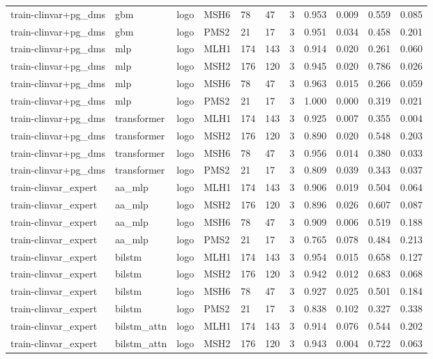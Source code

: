 \begin{table}[t]
\begin{tabular}{lllllllllll}
train-clinvar+pg\_dms & gbm & logo & MSH6 & 78 & 47 & 3 & 0.953 & 0.009 & 0.559 & 0.085 \\
train-clinvar+pg\_dms & gbm & logo & PMS2 & 21 & 17 & 3 & 0.951 & 0.034 & 0.458 & 0.201 \\
train-clinvar+pg\_dms & mlp & logo & MLH1 & 174 & 143 & 3 & 0.914 & 0.020 & 0.261 & 0.060 \\
train-clinvar+pg\_dms & mlp & logo & MSH2 & 176 & 120 & 3 & 0.945 & 0.020 & 0.786 & 0.026 \\
train-clinvar+pg\_dms & mlp & logo & MSH6 & 78 & 47 & 3 & 0.963 & 0.015 & 0.266 & 0.059 \\
train-clinvar+pg\_dms & mlp & logo & PMS2 & 21 & 17 & 3 & 1.000 & 0.000 & 0.319 & 0.021 \\
train-clinvar+pg\_dms & transformer & logo & MLH1 & 174 & 143 & 3 & 0.925 & 0.007 & 0.355 & 0.004 \\
train-clinvar+pg\_dms & transformer & logo & MSH2 & 176 & 120 & 3 & 0.890 & 0.020 & 0.548 & 0.203 \\
train-clinvar+pg\_dms & transformer & logo & MSH6 & 78 & 47 & 3 & 0.956 & 0.014 & 0.380 & 0.033 \\
train-clinvar+pg\_dms & transformer & logo & PMS2 & 21 & 17 & 3 & 0.809 & 0.039 & 0.343 & 0.037 \\
train-clinvar\_expert & aa\_mlp & logo & MLH1 & 174 & 143 & 3 & 0.906 & 0.019 & 0.504 & 0.064 \\
train-clinvar\_expert & aa\_mlp & logo & MSH2 & 176 & 120 & 3 & 0.896 & 0.026 & 0.607 & 0.087 \\
train-clinvar\_expert & aa\_mlp & logo & MSH6 & 78 & 47 & 3 & 0.909 & 0.006 & 0.519 & 0.188 \\
train-clinvar\_expert & aa\_mlp & logo & PMS2 & 21 & 17 & 3 & 0.765 & 0.078 & 0.484 & 0.213 \\
train-clinvar\_expert & bilstm & logo & MLH1 & 174 & 143 & 3 & 0.954 & 0.015 & 0.658 & 0.127 \\
train-clinvar\_expert & bilstm & logo & MSH2 & 176 & 120 & 3 & 0.942 & 0.012 & 0.683 & 0.068 \\
train-clinvar\_expert & bilstm & logo & MSH6 & 78 & 47 & 3 & 0.927 & 0.025 & 0.501 & 0.184 \\
train-clinvar\_expert & bilstm & logo & PMS2 & 21 & 17 & 3 & 0.838 & 0.102 & 0.327 & 0.338 \\
train-clinvar\_expert & bilstm\_attn & logo & MLH1 & 174 & 143 & 3 & 0.914 & 0.076 & 0.544 & 0.202 \\
train-clinvar\_expert & bilstm\_attn & logo & MSH2 & 176 & 120 & 3 & 0.943 & 0.004 & 0.722 & 0.063 \\

\end{tabular}
\end{table}
